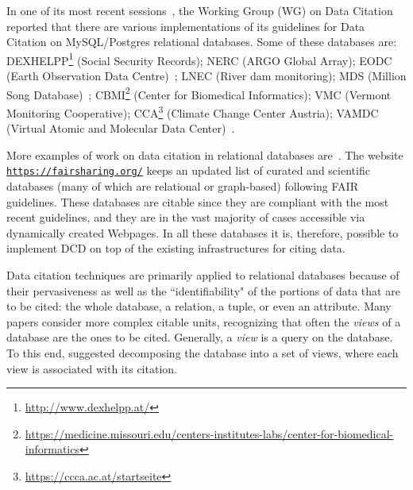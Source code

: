 \documentclass[preprint,12pt,sort&compress]{elsarticle}
\begin{document}
In one of its most recent sessions~\citep{rauber2015data}, the Working Group (WG) on Data Citation reported that there are various implementations of its guidelines for Data Citation on MySQL/Postgres relational databases. 
Some of these databases are: DEXHELPP\footnote{\url{http://www.dexhelpp.at/}} (Social Security Records); NERC (ARGO Global Array); EODC (Earth Observation Data Centre)~\citep{gosswein2019data}; LNEC (River dam monitoring); MDS (Million Song Database)~\citep{bertin2011million}; CBMI\footnote{\url{https://medicine.missouri.edu/centers-institutes-labs/center-for-biomedical-informatics}} (Center for Biomedical Informatics); VMC (Vermont Monitoring Cooperative); CCA\footnote{\url{https://ccca.ac.at/startseite}} (Climate Change Center Austria); VAMDC (Virtual Atomic and Molecular Data Center)~\citep{Dubernet_2016, ZwolfEtAl2016}.

More examples of work on data citation in relational databases are~\citep{bunemann2016citation, WuSIGMOD18, AlawiniDHW17,davidson2017model}. 
The website \texttt{\url{https://fairsharing.org/}} keeps an updated list of curated and scientific databases (many of which are relational or graph-based) following FAIR guidelines. These databases are citable since they are compliant with the most recent guidelines, and they are in the vast majority of cases accessible via dynamically created Webpages. 
In all these databases it is, therefore, possible to implement DCD on top of the existing infrastructures for citing data.

Data citation techniques are primarily applied to relational databases because of their pervasiveness as well as the ``identifiability" of the portions of data that are to be cited: the whole database, a relation, a tuple, or even an attribute. 
Many papers \citep{buneman2006cite, bunemann2016citation, AlawiniDHW17} consider more complex citable units, recognizing that often the \emph{views} of a database are the ones to be cited. Generally, a \emph{view} is a query on the database.
To this end, \citep{WuSIGMOD18} suggested decomposing the database into a set of views, where each view is associated with its citation. 
\end{document}
